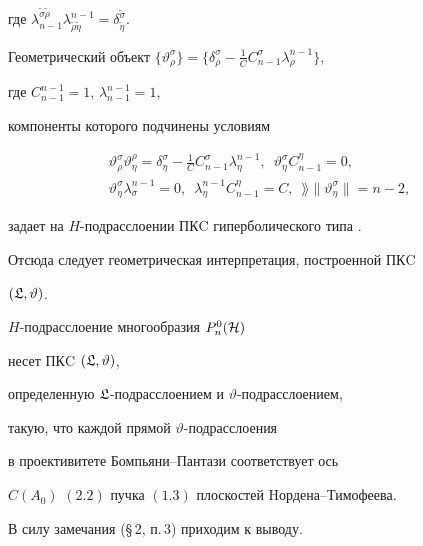 где $\lambda^{\tilde\sigma \tilde\rho}_{n-1}


\lambda^{n-1}_{\tilde\rho \tilde\eta}=\delta^{\tilde\sigma}_{\tilde\eta}$.


Геометрический объект $\{ \vartheta^\sigma_\rho\} =


\big\{ \delta^\sigma_\rho- \frac1C C^\sigma_{n-1}\lambda^{n-1}_\rho\big\}$,


где $C^{n-1}_{n-1}=1$, $\lambda^{n-1}_{n-1}=1$,


компоненты которого подчинены условиям


\begin{gather*}


\vartheta^\sigma_\rho \vartheta^\rho_\eta =


\delta^\sigma_\eta - \frac1C C^\sigma_{n-1}\lambda^{n-1}_\eta,\ \;


\vartheta^\sigma_\eta C^\eta_{n-1}=0, \\


\vartheta^\sigma_\eta \lambda^{n-1}_\sigma = 0,\ \;


\lambda^{n-1}_\eta C^\eta_{n-1}=C,\ \;


\rang\| \vartheta^\sigma_\eta \| = n-2,


\end{gather*}


задает на $H$-подрасслоении ПКC гиперболического типа \cite{rab8}.


Отсюда следует геометрическая интерпретация, построенной ПКC


$(\frak L, \vartheta)$.





\begin{thm}


$H$-подрасслоение многообразия $P^0_n(\cal H)$


несет ПКC $(\frak L, \vartheta)$,


определенную $\frak L$-под\-рас\-сло\-ением и $\vartheta$-подрасслоением,


такую, что каждой прямой $\vartheta$-подрасслоения 


в проективитете Бом\-пья\-ни--Пантази соответствует ось


$C(A_0)$\; $(2.2)$ пучка $(1.3)$ плоскостей Hордена--Тимофеева.


\end{thm}





В силу замечания (\S\,2, п.\,3) приходим к выводу.





